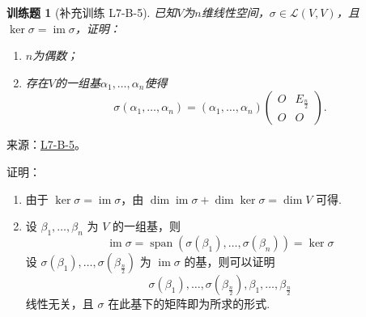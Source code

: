 \documentclass[12pt,fontset=fandol]{ctexart}
\newtheorem{exercise}{训练题}[section]
\begin{document}
\begin{exercise}[补充训练 L7-B-5]\label{prob:L7-B-5}
已知$V$为$n$维线性空间，$\sigma\in \mathcal{L}(V,V)$，且$\ker\sigma=\operatorname{im} \sigma$，证明：
        \begin{enumerate}
            \item $n$为偶数；

            \item 存在$V$的一组基$\alpha_1,\ldots,\alpha_n$使得
                  \[\sigma(\alpha_1,\ldots,\alpha_n)=(\alpha_1,\ldots,\alpha_n)\begin{pmatrix}
                          O & E_{\frac{n}{2}} \\ O & O
                      \end{pmatrix}.\]
        \end{enumerate}
\end{exercise}
\noindent 来源：\href{https://github.com/yhwu-is/Linear-Algebra-Left-Undone/blob/new/%E8%AE%B2%E4%B9%89/%E4%B8%93%E9%A2%98/7%20%E7%BA%BF%E6%80%A7%E6%98%A0%E5%B0%84%E7%9F%A9%E9%98%B5%E8%A1%A8%E7%A4%BA%E4%B8%8E%E7%9F%A9%E9%98%B5%E8%BF%90%E7%AE%97%E5%9F%BA%E7%A1%80.tex}{L7-B-5}。
\begin{solve}
证明：\begin{enumerate}
                \item 由于 $ \ker \sigma = \operatorname{im} \sigma $，由 $ \dim \operatorname{im} \sigma + \dim \ker \sigma = \dim V $ 可得.

                \item 设 $ \beta_1, \ldots, \beta_n $ 为 $ V $ 的一组基，则
                      \[ \operatorname{im} \sigma = \operatorname{span}(\sigma(\beta_1), \ldots, \sigma(\beta_n)) = \ker \sigma \]
                      设 $ \sigma(\beta_1), \ldots, \sigma(\beta_{\frac{n}{2}}) $ 为 $ \operatorname{im} \sigma $ 的基，则可以证明
                      \[ \sigma(\beta_1), \ldots, \sigma(\beta_{\frac{n}{2}}), \beta_1, \ldots, \beta_{\frac{n}{2}} \]
                      线性无关，且 $ \sigma $ 在此基下的矩阵即为所求的形式.
            \end{enumerate}
\end{solve}
\end{document}
